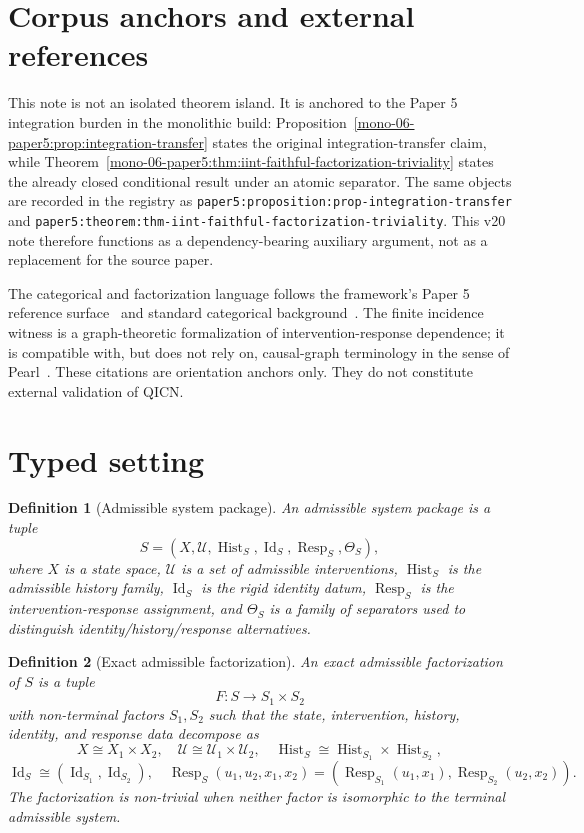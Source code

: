 \documentclass[11pt]{article}
\newtheorem{definition}{Definition}[section]
\newcommand{\Id}{\operatorname{Id}}
\newcommand{\Hist}{\operatorname{Hist}}
\newcommand{\Resp}{\operatorname{Resp}}
\begin{document}
\section{Corpus anchors and external references}
This note is not an isolated theorem island. It is anchored to the Paper 5 integration burden in the monolithic build: Proposition~\ref{mono-06-paper5:prop:integration-transfer} states the original integration-transfer claim, while Theorem~\ref{mono-06-paper5:thm:iint-faithful-factorization-triviality} states the already closed conditional result under an atomic separator. The same objects are recorded in the registry as \texttt{paper5:proposition:prop-integration-transfer} and \texttt{paper5:theorem:thm-iint-faithful-factorization-triviality}. This v20 note therefore functions as a dependency-bearing auxiliary argument, not as a replacement for the source paper.

The categorical and factorization language follows the framework's Paper 5 reference surface~\cite{paper5} and standard categorical background~\cite{maclane1998}. The finite incidence witness is a graph-theoretic formalization of intervention-response dependence; it is compatible with, but does not rely on, causal-graph terminology in the sense of Pearl~\cite{pearl2009}. These citations are orientation anchors only. They do not constitute external validation of QICN.

\section{Typed setting}

\begin{definition}[Admissible system package]
An admissible system package is a tuple
\[
  S = (X,\mathcal{U},\Hist_S,\Id_S,\Resp_S,\Theta_S),
\]
where $X$ is a state space, $\mathcal{U}$ is a set of admissible interventions, $\Hist_S$ is the admissible history family, $\Id_S$ is the rigid identity datum, $\Resp_S$ is the intervention-response assignment, and $\Theta_S$ is a family of separators used to distinguish identity/history/response alternatives.
\end{definition}

\begin{definition}[Exact admissible factorization]
An exact admissible factorization of $S$ is a tuple
\[
  F:S\longrightarrow S_1\times S_2
\]
with non-terminal factors $S_1,S_2$ such that the state, intervention, history, identity, and response data decompose as
\[
  X\cong X_1\times X_2,
  \quad
  \mathcal U\cong \mathcal U_1\times\mathcal U_2,
  \quad
  \Hist_S\cong \Hist_{S_1}\times\Hist_{S_2},
\]
\[
  \Id_S \cong (\Id_{S_1},\Id_{S_2}),
  \quad
  \Resp_S(u_1,u_2,x_1,x_2)=(\Resp_{S_1}(u_1,x_1),\Resp_{S_2}(u_2,x_2)).
\]
The factorization is non-trivial when neither factor is isomorphic to the terminal admissible system.
\end{definition}
\end{document}
